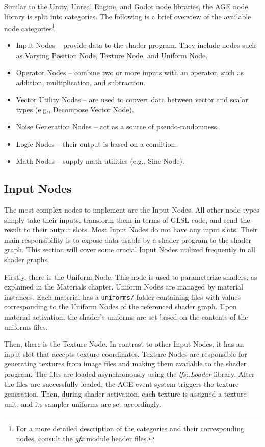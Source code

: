 \documentclass[
  digital,     %
  oneside,     %
  nosansbold,  %
  nocolorbold, %
  lof,         %
  lot,         %
]{fithesis4}
\begin{document}
Similar to the Unity, Unreal Engine, and Godot node libraries, the AGE node library is split into
categories. The following is a brief overview of the available node categories\footnote{For a more
detailed description of the categories and their corresponding nodes,
consult the \textit{gfx} module header files.}.
\begin{itemize}
    \item Input Nodes -- provide data to the shader program. They include nodes such as Varying Position Node,
    Texture Node, and Uniform Node.
    \item Operator Nodes -- combine two or more inputs with an operator, such as addition, multiplication,
    and subtraction.
    \item Vector Utility Nodes -- are used to convert data between vector and scalar types (e.g., Decompose Vector Node).
    \item Noise Generation Nodes -- act as a source of pseudo-randomness.
    \item Logic Nodes -- their output is based on a condition.
    \item Math Nodes -- supply math utilities (e.g., Sine Node).
\end{itemize}

\subsection{Input Nodes}
The most complex nodes to implement are the Input Nodes. All other node types simply take their inputs,
transform them in terms of GLSL code, and send the result to their output slots.
Most Input Nodes do not have any input slots.
Their main responsibility is to expose data usable by a shader program to the shader graph.
This section will cover some crucial Input Nodes utilized frequently in all shader graphs.

Firstly, there is the Uniform Node.
This node is used to parameterize shaders, as explained in the Materials chapter.
Uniform Nodes are managed by material instances. Each material has a \verb|uniforms/| folder
containing files with values corresponding to the Uniform Nodes of the referenced shader graph.
Upon material activation, the shader's uniforms are set based on the contents of the uniforms files.

Then, there is the Texture Node. In contrast to other Input Nodes, it has an input slot that accepts texture coordinates.
Texture Nodes are responsible for generating textures from image
files and making them available to the shader program. The files are loaded asynchronously using the
\textit{lfs::Loader} library. After the files are successfully loaded, the AGE event system triggers the texture generation.
Then, during shader activation, each texture is assigned
a texture unit, and its sampler uniforms are set accordingly.
\end{document}
